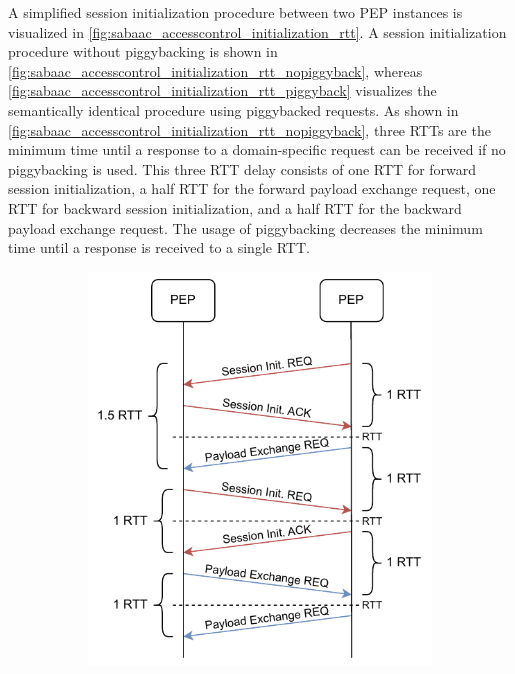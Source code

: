 \begin{description}
    A simplified session initialization procedure between two PEP instances is visualized in \autoref{fig:sabaac_accesscontrol_initialization_rtt}.
    A session initialization procedure without piggybacking is shown in \autoref{fig:sabaac_accesscontrol_initialization_rtt_nopiggyback}, whereas \autoref{fig:sabaac_accesscontrol_initialization_rtt_piggyback} visualizes the semantically identical procedure using piggybacked requests.
    As shown in \autoref{fig:sabaac_accesscontrol_initialization_rtt_nopiggyback}, three RTTs are the minimum time until a response to a domain-specific request can be received if no piggybacking is used.
    This three RTT delay consists of one RTT for forward session initialization, a half RTT for the forward payload exchange request, one RTT for backward session initialization, and a half RTT for the backward payload exchange request.
    The usage of piggybacking decreases the minimum time until a response is received to a single RTT.
    \begin{figure}
        \centering
        \begin{subfigure}[t]{0.48\linewidth}
            \centering
            \includegraphics[width=\linewidth]{figures/SABAAC_protocols_accesscontrol_initialization_rtt_nopiggyback.drawio.pdf}

\end{subfigure}
\end{figure}
\end{description}
